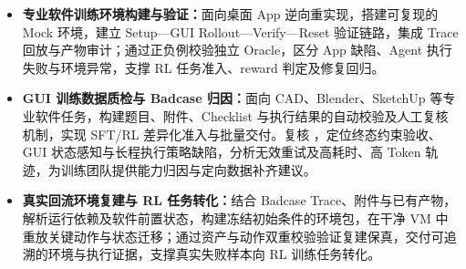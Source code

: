 \begin{itemize}
  \item \textbf{专业软件训练环境构建与验证：}面向桌面 App 逆向重实现，搭建可复现的 Mock 环境，建立 Setup—GUI Rollout—Verify—Reset 验证链路，集成 Trace 回放与产物审计；通过正负例校验独立 Oracle，区分 App 缺陷、Agent 执行失败与环境异常，支撑 RL 任务准入、reward 判定及修复回归。
  \item \textbf{GUI 训练数据质检与 Badcase 归因：}面向 CAD、Blender、SketchUp 等专业软件任务，构建题目、附件、Checklist 与执行结果的自动校验及人工复核机制，实现 SFT/RL 差异化准入与批量交付。复核 ，定位终态约束验收、GUI 状态感知与长程执行策略缺陷，分析无效重试及高耗时、高 Token 轨迹，为训练团队提供能力归因与定向数据补齐建议。
  \item \textbf{真实回流环境复建与 RL 任务转化：}结合 Badcase Trace、附件与已有产物，解析运行依赖及软件前置状态，构建冻结初始条件的环境包，在干净 VM 中重放关键动作与状态迁移；通过资产与动作双重校验验证复建保真，交付可追溯的环境与执行证据，支撑真实失败样本向 RL 训练任务转化。
\end{itemize}
\entryspace
{}

